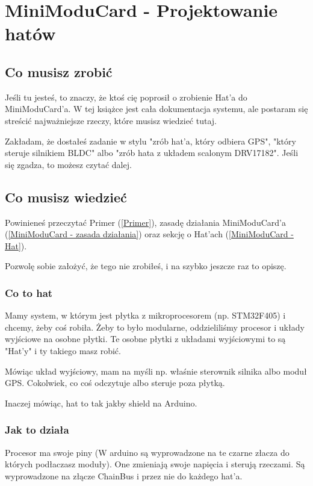 \documentclass[b5paper, 10pt, twoside]{book}
\begin{document}
\section{MiniModuCard - Projektowanie hatów} \label{MiniModuCard - Projektowanie hatów}
\subsection{Co musisz zrobić}

Jeśli tu jesteś, to znaczy, że ktoś cię poprosił o zrobienie Hat'a do MiniModuCard'a. W tej książce jest cała dokumentacja systemu, ale postaram się streścić najważniejsze rzeczy, które musisz wiedzieć tutaj.

Zakładam, że dostałeś zadanie w stylu "zrób hat'a, który odbiera GPS", "który steruje silnikiem BLDC" albo "zrób hata z układem scalonym DRV17182". Jeśli się zgadza, to możesz czytać dalej.

\subsection{Co musisz wiedzieć}
Powinieneś przeczytać Primer (\ref{Primer}), zasadę działania MiniModuCard'a (\ref{MiniModuCard - zasada działania}) oraz sekcję o Hat'ach (\ref{MiniModuCard - Hat}).

Pozwolę sobie założyć, że tego nie zrobiłeś, i na szybko jeszcze raz to opiszę.

\subsubsection{Co to hat}

Mamy system, w którym jest płytka z mikroprocesorem (np. STM32F405) i chcemy, żeby coś robiła. Żeby to było modularne, oddzieliliśmy procesor i układy wyjściowe na osobne płytki. Te osobne płytki z układami wyjściowymi to są "Hat'y" i ty takiego masz robić.

Mówiąc układ wyjściowy, mam na myśli np. właśnie sterownik silnika albo moduł GPS. Cokolwiek, co coś odczytuje albo steruje poza płytką.

Inaczej mówiąc, hat to tak jakby shield na Arduino.

\subsubsection{Jak to działa}

Procesor ma swoje piny (W arduino są wyprowadzone na te czarne złacza do których podłaczasz moduły). One zmieniają swoje napięcia i sterują rzeczami. Są wyprowadzone na złącze ChainBus i przez nie do każdego hat'a.
\end{document}
